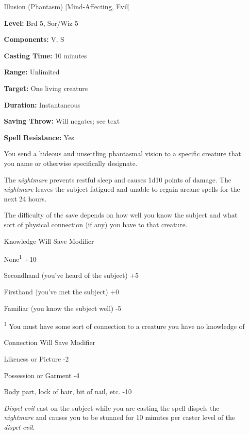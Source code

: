 
Illusion (Phantasm) [Mind-Affecting, Evil]

\textbf{Level:} Brd 5, Sor/Wiz 5

\textbf{Components:} V, S

\textbf{Casting Time:} 10 minutes

\textbf{Range:} Unlimited

\textbf{Target:} One living creature

\textbf{Duration:} Instantaneous

\textbf{Saving Throw:} Will negates; see text

\textbf{Spell Resistance:} Yes

You send a hideous and unsettling phantasmal vision to a specific creature that 
you name or otherwise specifically designate.

The \textit{nightmare} prevents restful sleep and causes 1d10 points of damage. 
The \textit{nightmare} leaves the subject fatigued and unable to regain arcane 
spells for the next 24 hours.

The difficulty of the save depends on how well you know the subject and what sort 
of physical connection (if any) you have to that creature.

\begin{description*}
\item[Knowledge] Will Save Modifier
\item[None\textsuperscript{1}] +10
\item[Secondhand (you've heard of the subject)] +5
\item[Firsthand (you've met the subject)] +0
\item[Familiar (you know the subject well)] -5
\end{description*}

\textsuperscript{1} You must have some sort of connection to a creature you have no knowledge of

\begin{description*}
\item[Connection] Will Save Modifier
\item[Likeness or Picture] -2
\item[Possession or Garment] -4
\item[Body part, lock of hair, bit of nail, etc.] -10
\end{description*}


\textit{Dispel evil} cast on the subject while you are casting the spell dispels 
the \textit{nightmare} and causes you to be stunned for 10 minutes per caster level 
of the \textit{dispel evil}.

